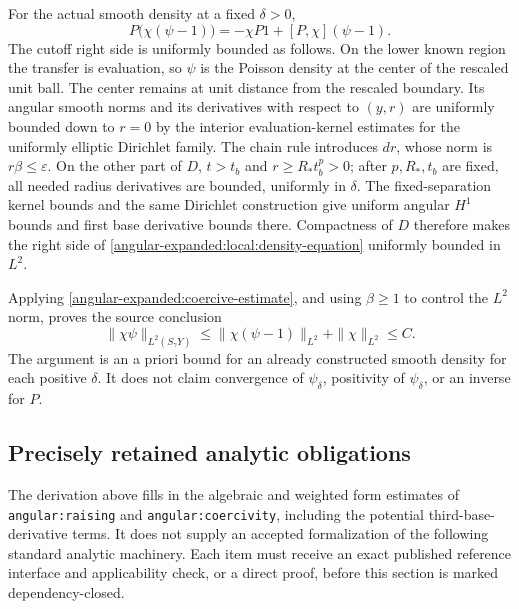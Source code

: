 \documentclass[11pt]{article}
\theoremstyle{definition}
\theoremstyle{remark}
\numberwithin{equation}{section}
\begin{document}
For the actual smooth density at a fixed $\delta>0$,
\begin{equation}\label{angular-expanded:local:density-equation}
 P\bigl(\chi(\psi-1)\bigr)=-\chi P1+[P,\chi](\psi-1).
\end{equation}
The cutoff right side is uniformly bounded as follows.  On the lower known
region the transfer is evaluation, so $\psi$ is the Poisson density at the
center of the rescaled unit ball.  The center remains at unit distance from
the rescaled boundary.  Its angular smooth norms and its derivatives with
respect to $(y,r)$ are uniformly bounded down to $r=0$ by the interior
evaluation-kernel estimates for the uniformly elliptic Dirichlet family.
The chain rule introduces $dr$, whose norm is $r\beta\leq\varepsilon$.
On the other part of $D$, $t>t_b$ and
$r\geq R_*t_b^p>0$; after $p,R_*,t_b$ are fixed, all needed radius
derivatives are bounded, uniformly in $\delta$.  The fixed-separation
kernel bounds and the same Dirichlet construction give uniform angular
$H^1$ bounds and first base derivative bounds there.  Compactness of $D$
therefore makes the right side of \eqref{angular-expanded:local:density-equation} uniformly
bounded in $L^2$.

Applying \eqref{angular-expanded:coercive-estimate}, and using $\beta\geq1$ to
control the $L^2$ norm, proves the source conclusion
\begin{equation}\label{angular-expanded:local:density-bound}
 \|\chi\psi\|_{L^2(S_\gamma Y)}
 \leq\|\chi(\psi-1)\|_{L^2}+\|\chi\|_{L^2}\leq C.
\end{equation}
\label{angular-expanded:local:density}
The argument is an a priori bound for an already constructed smooth
density for each positive $\delta$.  It does not claim convergence of
$\psi_\delta$, positivity of $\psi_\delta$, or an inverse for $P$.

\subsection{Precisely retained analytic obligations}

The derivation above fills in the algebraic and weighted form estimates of
\texttt{angular:raising} and \texttt{angular:coercivity}, including the
potential third-base-derivative terms.  It does not supply an accepted
formalization of the following standard analytic machinery.  Each item
must receive an exact published reference interface and applicability check,
or a direct proof, before this section is marked dependency-closed.
\end{document}
